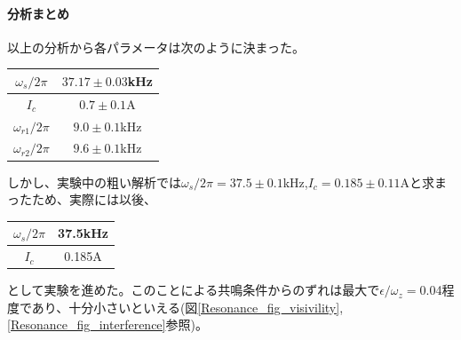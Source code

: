 \clearpage
\paragraph{分析まとめ}
以上の分析から各パラメータは次のように決まった。
\begin{table}[h]
\centering
\begin{tabular}{|c|c|} \hline
$\omega_s/2\pi$&$37.17\pm0.03$kHz\\ \hline
$I_c$&$0.7\pm0.1$A \\ \hline
$\omega_{r1}/2\pi$&$9.0\pm0.1$kHz \\ \hline
$\omega_{r2}/2\pi$&$9.6\pm0.1$kHz \\ \hline
\end{tabular}
\end{table}

しかし、実験中の粗い解析では$\omega_s/2\pi=37.5\pm0.1$kHz,$I_c=0.185\pm0.11$Aと求まったため、実際には以後、
\begin{table}[h]
\centering
\begin{tabular}{|c|c|} \hline
$\omega_s/2\pi$&37.5kHz\\ \hline
$I_c$&0.185A \\ \hline
\end{tabular}
\end{table}

\noindent として実験を進めた。このことによる共鳴条件からのずれは最大で$\epsilon/\omega_z=$0.04程度であり、十分小さいといえる(図\ref{Resonance_fig_visivility},\ref{Resonance_fig_interference}参照)。
